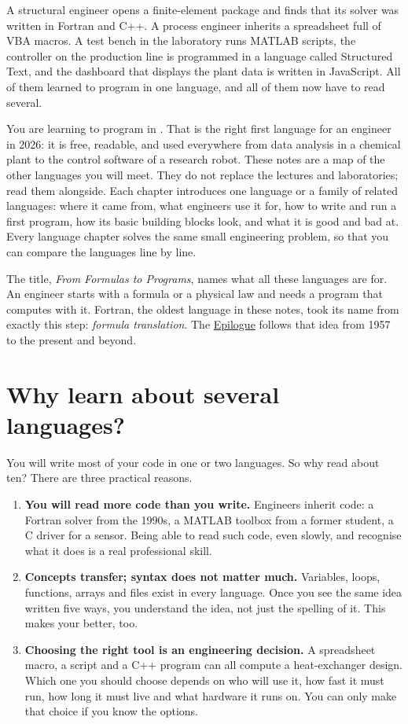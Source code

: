 A structural engineer opens a finite-element package and finds that its solver was written
in Fortran and C++. A process engineer inherits a spreadsheet full of VBA macros. A test
bench in the laboratory runs MATLAB scripts, the controller on the production line is
programmed in a language called Structured Text, and the dashboard that displays the plant
data is written in JavaScript. All of them learned to program in one language, and all of
them now have to read several.

You are learning to program in \py. That is the right first language for an engineer in
2026: it is free, readable, and used everywhere from data analysis in a chemical plant to
the control software of a research robot. These notes are a map of the other languages you
will meet. They do not replace the \py lectures and laboratories; read them alongside.
Each chapter introduces one language or a family of related languages: where it came
from, what engineers use it for, how to write and run a first program, how its basic
building blocks look, and what it is good and bad at. Every language chapter solves the
same small engineering problem, so that you can compare the languages line by line.

The title, \emph{From Formulas to Programs}, names what all these languages are for. An
engineer starts with a formula or a physical law and needs a program that computes with
it. Fortran, the oldest language in these notes, took its name from exactly this step:
\emph{formula translation}. The \hyperref[epilogue]{Epilogue} follows that idea from 1957
to the present and beyond.

\section*{Why learn about several languages?}

You will write most of your code in one or two languages. So why read about ten?
There are three practical reasons.

\begin{enumerate}
\item \textbf{You will read more code than you write.} Engineers inherit code:
  a Fortran solver from the 1990s, a MATLAB toolbox from a former student,
  a C driver for a sensor. Being able to read such code, even slowly, and
  recognise what it does is a real professional skill.
\item \textbf{Concepts transfer; syntax does not matter much.} Variables, loops,
  functions, arrays and files exist in every language. Once you see the same idea
  written five ways, you understand the idea, not just the \py spelling of it.
  This makes your \py better, too.
\item \textbf{Choosing the right tool is an engineering decision.} A spreadsheet
  macro, a \py script and a C++ program can all compute a heat-exchanger
  design. Which one you should choose depends on who will use it, how fast it must
  run, how long it must live and what hardware it runs on. You can only make that
  choice if you know the options.
\end{enumerate}

